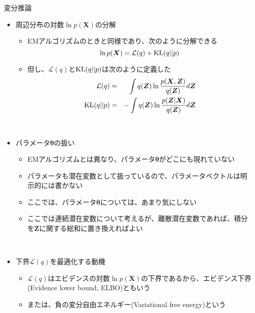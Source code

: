 \documentclass[dvipdfmx,notheorems,t]{beamer}
\begin{document}
\begin{frame}{変分推論}

\begin{itemize}
	\item 周辺分布の対数$\ln p(\bm{X})$の分解
	\begin{itemize}
		\item EMアルゴリズムのときと同様であり、次のように分解できる
		\begin{equation}
			\ln p(\bm{X}) = \mathcal{L}(q) + \operatorname{KL} (q || p)
		\end{equation}
		
		\item 但し、$\mathcal{L}(q)$と$\operatorname{KL} (q || p)$は次のように定義した
		\begin{eqnarray}
			\mathcal{L}(q) &=& \int q(\bm{Z}) \ln \frac{p(\bm{X}, \bm{Z})}{q(\bm{Z})} d\bm{Z} \\
			\operatorname{KL} (q || p) &=& -\int q(\bm{Z}) \ln \frac{p(\bm{Z} | \bm{X})}{q(\bm{Z})} d\bm{Z}
		\end{eqnarray}
	\end{itemize} \
		
	\item パラメータ$\bm{\theta}$の扱い
	\begin{itemize}
		\item EMアルゴリズムとは異なり、\color{red}パラメータ$\bm{\theta}$がどこにも現れていない\normalcolor
		\item \alert{パラメータも潜在変数として扱っている}ので、パラメータベクトルは明示的には書かない
		\item ここでは、パラメータ$\bm{\theta}$については、あまり気にしない
		\newline
		\item ここでは連続潜在変数について考えるが、離散潜在変数であれば、積分を$\bm{Z}$に関する総和に置き換えればよい
	\end{itemize} \
	
	\item 下界$\mathcal{L}(q)$を最適化する動機
	\begin{itemize}
		\item $\mathcal{L}(q)$はエビデンスの対数$\ln p(\bm{X})$の下界であるから、\alert{エビデンス下界}(Evidence lower bound, \alert{ELBO})ともいう
		\item または、負の\alert{変分自由エネルギー}(Variational free energy)という
		\newline
		

\end{itemize}
\end{itemize}
\end{frame}
\end{document}
